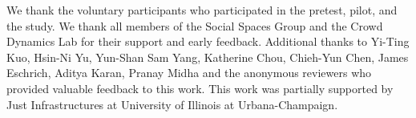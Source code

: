 \begin{acks}
We thank the voluntary participants who participated in the pretest, pilot, and the study. We thank all members of the Social Spaces Group and the Crowd Dynamics Lab for their support and early feedback. Additional thanks to Yi-Ting Kuo, Hsin-Ni Yu, Yun-Shan Sam Yang, Katherine Chou, Chieh-Yun Chen, James Eschrich, Aditya Karan, Pranay Midha and the anonymous reviewers who provided valuable feedback to this work. This work was partially supported by Just Infrastructures at University of Illinois at Urbana-Champaign.
\end{acks}



